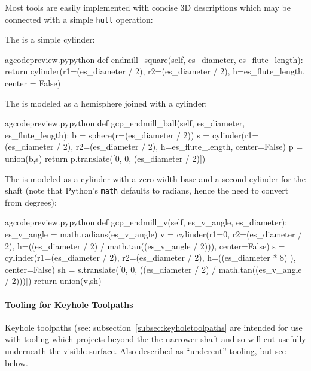 \documentclass{ltxdoc}
\begin{document}
Most tools are easily implemented with concise 3D descriptions which may be connected with a simple \texttt{hull} operation:

The  is a simple cylinder:
\lstset{firstnumber=\thegcpy}
\begin{writecode}{a}{gcodepreview.py}{python}
    def endmill_square(self, es_diameter, es_flute_length):
        return cylinder(r1=(es_diameter / 2), r2=(es_diameter / 2), h=es_flute_length, center = False)

\end{writecode}
\addtocounter{gcpy}{3}

The  is modeled as a hemisphere joined with a cylinder:

\lstset{firstnumber=\thegcpy}
\begin{writecode}{a}{gcodepreview.py}{python}
    def gcp_endmill_ball(self, es_diameter, es_flute_length):
        b = sphere(r=(es_diameter / 2))
        s = cylinder(r1=(es_diameter / 2), r2=(es_diameter / 2), h=es_flute_length, center=False)
        p = union(b,s)
        return p.translate([0, 0, (es_diameter / 2)])

\end{writecode}
\addtocounter{gcpy}{6}

The  is modeled as a cylinder with a zero width base and a second cylinder for the shaft (note that Python's \verb|math| defaults to radians, hence the need to convert from degrees):

\lstset{firstnumber=\thegcpy}
\begin{writecode}{a}{gcodepreview.py}{python}
    def gcp_endmill_v(self, es_v_angle, es_diameter):
        es_v_angle = math.radians(es_v_angle)
        v = cylinder(r1=0, r2=(es_diameter / 2), h=((es_diameter / 2) / math.tan((es_v_angle / 2))), center=False)
        s = cylinder(r1=(es_diameter / 2), r2=(es_diameter / 2), h=((es_diameter * 8) ), center=False)
        sh = s.translate([0, 0, ((es_diameter / 2) / math.tan((es_v_angle / 2)))])
        return union(v,sh)

\end{writecode}
\addtocounter{gcpy}{7}

\paragraph{Tooling for Keyhole Toolpaths}

\label{para:undercuttooling} Keyhole toolpaths (see: subsection~\ref{subsec:keyholetoolpaths} are intended for use with tooling which projects beyond the the narrower shaft and so will cut usefully underneath the visible surface. Also described as ``undercut'' tooling, but see below.
\end{document}
